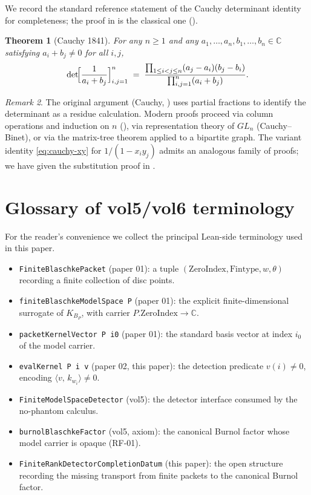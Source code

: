 \documentclass[12pt]{article}
\newtheorem{theorem}{Theorem}[section]
\theoremstyle{definition}
\theoremstyle{remark}
\newtheorem{remark}[theorem]{Remark}
\newcommand{\C}{\mathbb{C}}
\newcommand{\KBP}{K_{B_{P}}}
\newcommand{\inner}[2]{\langle #1,\,#2\rangle}
\begin{document}
We record the standard reference statement of the Cauchy determinant
identity for completeness; the proof in  is the
classical one (\cite[\S0.9.12, Problem 27]{HornJohnson}).

\begin{theorem}[Cauchy 1841]\label{thm:cauchy-app}
For any $n\ge1$ and any $a_{1},\dots,a_{n},b_{1},\dots,b_{n}\in\C$
satisfying $a_{i}+b_{j}\neq0$ for all $i,j$,
\[
  \det\!\Bigl[\frac{1}{a_{i}+b_{j}}\Bigr]_{i,j=1}^{n}
   \;=\;\frac{\prod_{1\le i<j\le n}(a_{j}-a_{i})(b_{j}-b_{i})}
              {\prod_{i,j=1}^{n}(a_{i}+b_{j})}.
\]
\end{theorem}

\begin{remark}\label{rem:cauchy-history}
The original argument (Cauchy, \cite{Cauchy}) uses partial fractions to
identify the determinant as a residue calculation. Modern proofs proceed
via column operations and induction on $n$ (\cite{HornJohnson}), via
representation theory of $GL_{n}$ (Cauchy--Binet), or via the matrix-tree
theorem applied to a bipartite graph. The variant identity
\eqref{eq:cauchy-xy} for $1/(1-x_{i}y_{j})$ admits an analogous family
of proofs; we have given the substitution proof in .
\end{remark}

\section{Glossary of vol5/vol6 terminology}\label{app:glossary}

For the reader's convenience we collect the principal Lean-side
terminology used in this paper.

\begin{itemize}\itemsep0pt
  \item \texttt{FiniteBlaschkePacket} (paper 01): a tuple
        $(\mathrm{ZeroIndex},\mathrm{Fintype},w,\theta)$ recording a
        finite collection of disc points.
  \item \texttt{finiteBlaschkeModelSpace P} (paper 01): the explicit
        finite-dimensional surrogate of $\KBP$, with carrier
        $P.\mathrm{ZeroIndex}\to\C$.
  \item \texttt{packetKernelVector P i0} (paper 01): the standard basis
        vector at index $i_{0}$ of the model carrier.
  \item \texttt{evalKernel P i v} (paper 02, this paper): the detection
        predicate $v(i)\neq0$, encoding $\inner{v}{k_{w_{i}}}\neq0$.
  \item \texttt{FiniteModelSpaceDetector} (vol5): the detector
        interface consumed by the no-phantom calculus.
  \item \texttt{burnolBlaschkeFactor} (vol5, axiom): the canonical
        Burnol factor whose model carrier is opaque (RF-01).
  \item \texttt{FiniteRankDetectorCompletionDatum} (this paper): the
        open structure recording the missing transport from finite
        packets to the canonical Burnol factor.
\end{itemize}
\end{document}
